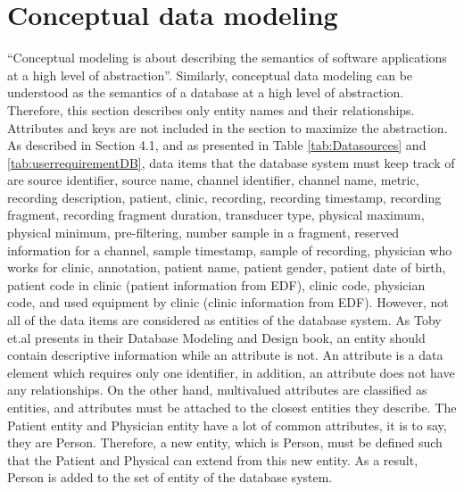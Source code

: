 \section{Conceptual data modeling}
“Conceptual modeling is about describing the semantics of software applications at a high level of abstraction”\citep{CONCEPTUAL_BOOK}. Similarly, conceptual data modeling can be understood as the semantics of a database at a high level of abstraction. Therefore, this section describes only entity names and their relationships. Attributes and keys are not included in the section to maximize the abstraction. As described in Section 4.1, and as presented in Table \ref{tab:Datasources} and \ref{tab:userrequirementDB}, data items that the database system must keep track of are source identifier, source name, channel identifier, channel name, metric, recording description, patient, clinic, recording, recording timestamp, recording fragment, recording fragment duration, transducer type, physical maximum, physical minimum, pre-filtering, number sample in a fragment, reserved information for a channel, sample timestamp, sample of recording, physician who works for clinic, annotation, patient name, patient gender, patient date of birth, patient code in clinic (patient information from EDF), clinic code, physician code, and used equipment by clinic (clinic information from EDF). However, not all of the data items are considered as entities of the database system. As Toby et.al\citep{DATABASEMODELING_BOOK} presents in their Database Modeling and Design book, an entity should contain descriptive information while an attribute is not. An attribute is a data element which requires only one identifier, in addition, an attribute does not have any relationships. On the other hand, multivalued attributes are classified as entities, and attributes must be attached to the closest entities they describe. The Patient entity and Physician entity have a lot of common attributes, it is to say, they are Person. Therefore, a new entity, which is Person, must be defined such that the Patient and Physical can extend from this new entity. As a result, Person is added to the set of entity of the database system.\\

